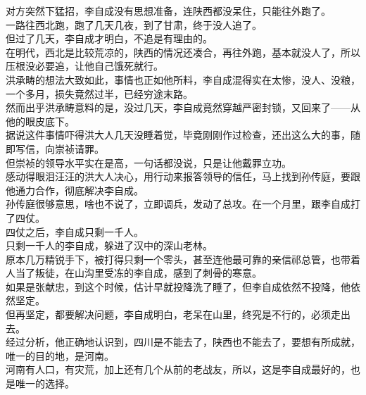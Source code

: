 \begin{multicols}{\theparacolNo}
对方突然下猛招，李自成没有思想准备，连陕西都没呆住，只能往外跑了。\\

一路往西北跑，跑了几天几夜，到了甘肃，终于没人追了。\\

但过了几天，李自成才明白，不追是有理由的。\\

在明代，西北是比较荒凉的，陕西的情况还凑合，再往外跑，基本就没人了，所以压根没必要追，让他自己饿死就行。\\

洪承畴的想法大致如此，事情也正如他所料，李自成混得实在太惨，没人、没粮，一个多月，损失竟然过半，已经穷途末路。\\

然而出乎洪承畴意料的是，没过几天，李自成竟然穿越严密封锁，又回来了——从他的眼皮底下。\\

据说这件事情吓得洪大人几天没睡着觉，毕竟刚刚作过检查，还出这么大的事，随即写信，向崇祯请罪。\\

但崇祯的领导水平实在是高，一句话都没说，只是让他戴罪立功。\\

感动得眼泪汪汪的洪大人决心，用行动来报答领导的信任，马上找到孙传庭，要跟他通力合作，彻底解决李自成。\\

孙传庭很够意思，啥也不说了，立即调兵，发动了总攻。在一个月里，跟李自成打了四仗。\\

四仗之后，李自成只剩一千人。\\

只剩一千人的李自成，躲进了汉中的深山老林。\\

原本几万精锐手下，被打得只剩一个零头，甚至连他最可靠的亲信祁总管，也带着人当了叛徒，在山沟里受冻的李自成，感到了刺骨的寒意。\\

如果是张献忠，到这个时候，估计早就投降洗了睡了，但李自成依然不投降，他依然坚定。\\

但再坚定，都要解决问题，李自成明白，老呆在山里，终究是不行的，必须走出去。\\

经过分析，他正确地认识到，四川是不能去了，陕西也不能去了，要想有所成就，唯一的目的地，是河南。\\

河南有人口，有灾荒，加上还有几个从前的老战友，所以，这是李自成最好的，也是唯一的选择。\\


\end{multicols}
